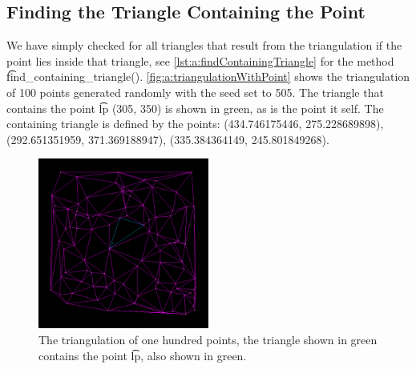 \subsection{Finding the Triangle Containing the Point}
We have simply checked for all triangles that result from the triangulation if the point lies inside that triangle, see \autoref{lst:a:findContainingTriangle} for the method \t{find_containing_triangle()}. \autoref{fig:a:triangulationWithPoint} shows the triangulation of 100 points generated randomly with the seed set to 505. The triangle that contains the point \t{lp} (305, 350) is shown in green, as is the point it self. The containing triangle is defined by the points: (\num{434.746175446}, \num{275.228689898}), (\num{292.651351959}, \num{371.369188947}), (\num{335.384364149}, \num{245.801849268}).



\begin{figure}
	\centering
	\includegraphics[width=0.5\textwidth]{./img/a_triangulationWithPoint}
	\caption{The triangulation of one hundred points, the triangle shown in green contains the point \t{lp}, also shown in green.}
	\label{fig:a:triangulationWithPoint}
\end{figure}


